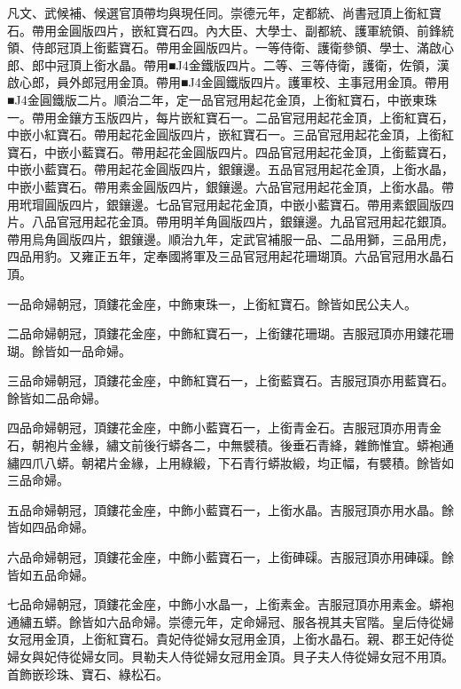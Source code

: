 \begin{pinyinscope}
凡文、武候補、候選官頂帶均與現任同。崇德元年，定都統、尚書冠頂上銜紅寶石。帶用金圓版四片，嵌紅寶石四。內大臣、大學士、副都統、護軍統領、前鋒統領、侍郎冠頂上銜藍寶石。帶用金圓版四片。一等侍衛、護衛參領、學士、滿啟心郎、郎中冠頂上銜水晶。帶用■J4金鐵版四片。二等、三等侍衛，護衛，佐領，漢啟心郎，員外郎冠用金頂。帶用■J4金圓鐵版四片。護軍校、主事冠用金頂。帶用■J4金圓鐵版二片。順治二年，定一品官冠用起花金頂，上銜紅寶石，中嵌東珠一。帶用金鑲方玉版四片，每片嵌紅寶石一。二品官冠用起花金頂，上銜紅寶石，中嵌小紅寶石。帶用起花金圓版四片，嵌紅寶石一。三品官冠用起花金頂，上銜紅寶石，中嵌小藍寶石。帶用起花金圓版四片。四品官冠用起花金頂，上銜藍寶石，中嵌小藍寶石。帶用起花金圓版四片，銀鑲邊。五品官冠用起花金頂，上銜水晶，中嵌小藍寶石。帶用素金圓版四片，銀鑲邊。六品官冠用起花金頂，上銜水晶。帶用玳瑁圓版四片，銀鑲邊。七品官冠用起花金頂，中嵌小藍寶石。帶用素銀圓版四片。八品官冠用起花金頂。帶用明羊角圓版四片，銀鑲邊。九品官冠用起花銀頂。帶用烏角圓版四片，銀鑲邊。順治九年，定武官補服一品、二品用獅，三品用虎，四品用豹。又雍正五年，定奉國將軍及三品官冠用起花珊瑚頂。六品官冠用水晶石頂。

一品命婦朝冠，頂鏤花金座，中飾東珠一，上銜紅寶石。餘皆如民公夫人。

二品命婦朝冠，頂鏤花金座，中飾紅寶石一，上銜鏤花珊瑚。吉服冠頂亦用鏤花珊瑚。餘皆如一品命婦。

三品命婦朝冠，頂鏤花金座，中飾紅寶石一，上銜藍寶石。吉服冠頂亦用藍寶石。餘皆如二品命婦。

四品命婦朝冠，頂鏤花金座，中飾小藍寶石一，上銜青金石。吉服冠頂亦用青金石，朝袍片金緣，繡文前後行蟒各二，中無襞積。後垂石青絳，雜飾惟宜。蟒袍通繡四爪八蟒。朝裙片金緣，上用綠緞，下石青行蟒妝緞，均正幅，有襞積。餘皆如三品命婦。

五品命婦朝冠，頂鏤花金座，中飾小藍寶石一，上銜水晶。吉服冠頂亦用水晶。餘皆如四品命婦。

六品命婦朝冠，頂鏤花金座，中飾小藍寶石一，上銜硨磲。吉服冠頂亦用硨磲。餘皆如五品命婦。

七品命婦朝冠，頂鏤花金座，中飾小水晶一，上銜素金。吉服冠頂亦用素金。蟒袍通繡五蟒。餘皆如六品命婦。崇德元年，定命婦冠、服各視其夫官階。皇后侍從婦女冠用金頂，上銜紅寶石。貴妃侍從婦女冠用金頂，上銜水晶石。親、郡王妃侍從婦女與妃侍從婦女同。貝勒夫人侍從婦女冠用金頂。貝子夫人侍從婦女冠不用頂。首飾嵌珍珠、寶石、綠松石。


\end{pinyinscope}
